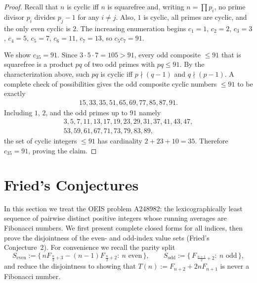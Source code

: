 \documentclass[12pt]{article}
\providecommand{\seqnum}[1]{#1}
\theoremstyle{remark}
\begin{document}
\begin{proof}
Recall that $n$ is cyclic iff $n$ is squarefree and, writing $n=\prod p_i$, no prime divisor $p_i$ divides $p_j-1$ for any $i\ne j$. Also, $1$ is cyclic, all primes are cyclic, and the only even cyclic is $2$. The increasing enumeration begins $c_1=1$, $c_2=2$, $c_3=3$, $c_4=5$, $c_5=7$, $c_6=11$, $c_7=13$, so $c_5c_7=91$.

We show $c_{35}=91$. Since $3\cdot5\cdot7=105>91$, every odd composite $\le91$ that is squarefree is a product $pq$ of two odd primes with $pq\le91$. By the characterization above, such $pq$ is cyclic iff $p\nmid(q-1)$ and $q\nmid(p-1)$. A complete check of possibilities gives the odd composite cyclic numbers $\le91$ to be exactly
\[
\begin{gathered}
15,33,35,51,65,69,77,85,87,91.
\end{gathered}
\]
Including $1$, $2$, and the odd primes up to $91$ namely
\[
\begin{gathered}
3,5,7,11,13,17,19,23,29,31,37,41,43,47,\\
53,59,61,67,71,73,79,83,89,
\end{gathered}
\]
the set of cyclic integers $\le91$ has cardinality $2+23+10=35$. Therefore $c_{35}=91$, proving the claim.
\end{proof}



\section{Fried's Conjectures}

In this section we treat the OEIS problem \seqnum{A248982}: the lexicographically least sequence of pairwise distinct positive integers whose running averages are Fibonacci numbers. We first present complete closed forms for all indices, then prove the disjointness of the even- and odd-index value sets (Fried's Conjecture~2). For convenience we recall the parity split
\[
 S_{\mathrm{even}}:=\bigl\{\,nF_{\,\frac{n}{2}+3}-(n-1)F_{\,\frac{n}{2}+2}:\ n\text{ even}\,\bigr\},\qquad
 S_{\mathrm{odd}}:=\bigl\{\,F_{\,\frac{n+1}{2}+2}:\ n\text{ odd}\,\bigr\},
\]
and reduce the disjointness to showing that $T(n):=F_{n+2}+2nF_{n+1}$ is never a Fibonacci number.
\end{document}
